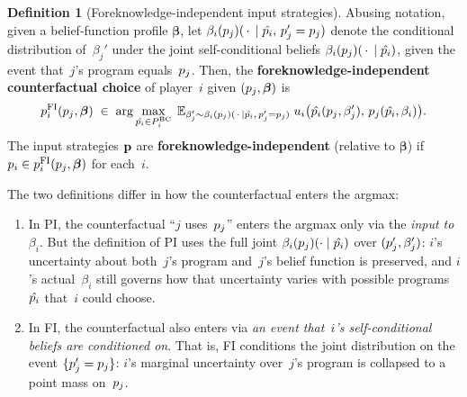 \documentclass[sigconf]{aamas}
\newcommand{\fullbf}{\boldsymbol{\beta}}
\theoremstyle{definition}
\newtheorem{definition}{Definition} %
\newcommand{\bcprogspacei}{P^{\mathrm{BC}}_i}
\begin{document}
\begin{definition}[Foreknowledge-independent input strategies]
\label{def:fi}
Abusing notation, given a belief-function profile $\fullbf$, let
$\beta_i(p_j)(\,\cdot\, \mid \hat{p_i},\, p_j' = p_j)$ denote the conditional distribution of~$\beta_j'$ under the joint self-conditional beliefs $\beta_i(p_j)(\,\cdot\, \mid \hat{p_i})$, given the event that~$j$'s program equals~$p_j$.
Then, the \textbf{foreknowledge-independent counterfactual choice} of player~$i$ given $(\progj, \fullbf)$ is
$$
\progi^{\text{FI}}(\progj, \fullbf) \;\in\; \arg\max_{\hat{\progi} \in \bcprogspacei} \; \mathbb{E}_{\beta_j' \sim \beta_i(\progj)(\,\cdot\, \mid \hat{\progi},\, \progj' = \progj)} \; \payi\bigl(\hat{\progi}(\progj, \beta_j'),\, \progj(\hat{\progi}, \beta_i)\bigr).
$$
The input strategies $\textbf{p}$ are \textbf{foreknowledge-independent} (relative to $\fullbf$) if $\progi \in \progi^{\text{FI}}(\progj, \fullbf)$ for each~$i$.
\end{definition}

The two definitions differ in how the counterfactual enters the argmax:
\begin{enumerate}
    \item In PI, the counterfactual “$j$ uses~$p_j$”
    enters the argmax only via the \textit{input to~$\beta_i$}.
    But the definition of PI uses the full joint $\beta_i(p_j)(\cdot \mid \hat{p_i})$ over $(p_j', \beta_j')$: $i$'s uncertainty about both~$j$'s program and~$j$'s belief function is preserved, and $i$'s actual~$\beta_i$ still governs how that uncertainty varies with possible programs~$\hat{p_i}$ that~$i$ could choose.
    \item In FI, the counterfactual also enters via \textit{an event that~$i$'s self-conditional beliefs are conditioned on}. That is, FI conditions the joint distribution on the event $\{p_j' = p_j\}$: $i$'s marginal uncertainty over~$j$'s program is collapsed to a point mass on~$p_j$.
\end{enumerate}
\end{document}
